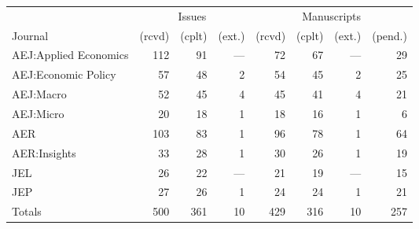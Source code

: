 
\begin{tabular}{@{\extracolsep{5pt}} lrrrrrrr} 
\toprule 
        & \multicolumn{3}{c}{Issues} & \multicolumn{4}{c}{Manuscripts}\\
        \cmidrule{2-4}\cmidrule{5-8}
Journal &  (rcvd) &  (cplt) &  (ext.) &  (rcvd) &  (cplt) &  (ext.) &  (pend.) \\ 
\midrule 
AEJ:Applied Economics & 112 & 91 & --- & 72 & 67 & --- & 29 \\ 
AEJ:Economic Policy & 57 & 48 & 2 & 54 & 45 & 2 & 25 \\ 
AEJ:Macro & 52 & 45 & 4 & 45 & 41 & 4 & 21 \\ 
AEJ:Micro & 20 & 18 & 1 & 18 & 16 & 1 & 6 \\ 
AER & 103 & 83 & 1 & 96 & 78 & 1 & 64 \\ 
AER:Insights & 33 & 28 & 1 & 30 & 26 & 1 & 19 \\ 
JEL & 26 & 22 & --- & 21 & 19 & --- & 15 \\ 
JEP & 27 & 26 & 1 & 24 & 24 & 1 & 21 \\ 
Totals & 500 & 361 & 10 & 429 & 316 & 10 & 257 \\ 
\bottomrule 
\end{tabular} 
